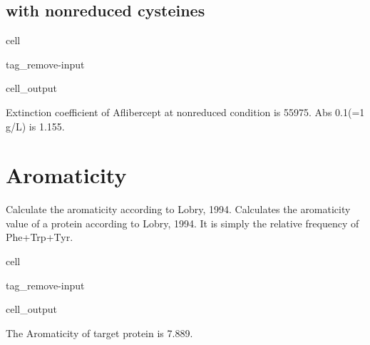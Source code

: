 \documentclass[letterpaper,10pt,english]{jupyterBook}
\begin{document}
\subsection{with non\sphinxhyphen{}reduced cysteines}
\label{\detokenize{ipynb/chapter1:with-non-reduced-cysteines}}
\begin{sphinxuseclass}{cell}
\begin{sphinxuseclass}{tag_remove-input}\begin{sphinxVerbatimOutput}

\begin{sphinxuseclass}{cell_output}
\begin{sphinxVerbatim}[commandchars=\\\{\}]
Extinction coefficient of Aflibercept at non\PYGZhy{}reduced condition is 55975.
Abs 0.1\PYGZpc{}(=1 g/L) is 1.155.
\end{sphinxVerbatim}

\end{sphinxuseclass}\end{sphinxVerbatimOutput}

\end{sphinxuseclass}
\end{sphinxuseclass}

\section{Aromaticity}
\label{\detokenize{ipynb/chapter1:aromaticity}}
\sphinxAtStartPar
Calculate the aromaticity according to Lobry, 1994. Calculates the aromaticity value of a protein according to Lobry, 1994. It is simply the relative frequency of Phe+Trp+Tyr.

\begin{sphinxuseclass}{cell}
\begin{sphinxuseclass}{tag_remove-input}\begin{sphinxVerbatimOutput}

\begin{sphinxuseclass}{cell_output}
\begin{sphinxVerbatim}[commandchars=\\\{\}]
The Aromaticity of target protein is 7.889\PYGZpc{}.
\end{sphinxVerbatim}

\end{sphinxuseclass}\end{sphinxVerbatimOutput}

\end{sphinxuseclass}
\end{sphinxuseclass}
\end{document}
